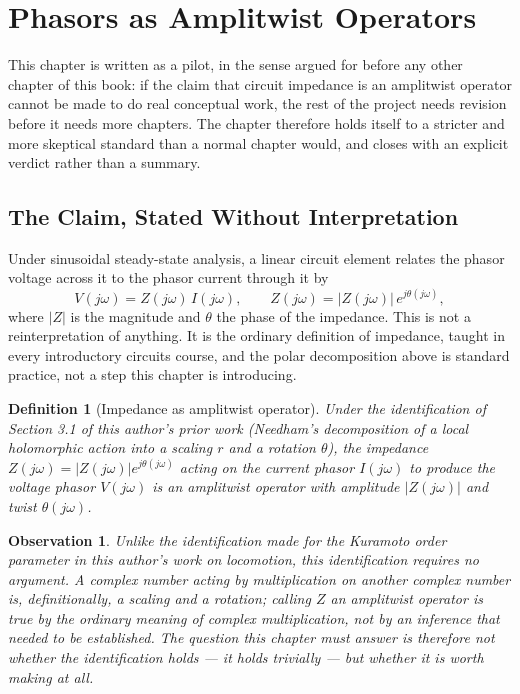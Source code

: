 \documentclass[12pt]{article}
\newtheorem{definition}{Definition}
\newtheorem{observation}{Observation}
\begin{document}
\section{Phasors as Amplitwist Operators}

This chapter is written as a pilot, in the sense argued for before any other chapter of this book: if the claim that circuit impedance is an amplitwist operator cannot be made to do real conceptual work, the rest of the project needs revision before it needs more chapters. The chapter therefore holds itself to a stricter and more skeptical standard than a normal chapter would, and closes with an explicit verdict rather than a summary.

\subsection{The Claim, Stated Without Interpretation}

Under sinusoidal steady-state analysis, a linear circuit element relates the phasor voltage across it to the phasor current through it by
\[
V(j\omega) = Z(j\omega)\, I(j\omega), \qquad Z(j\omega) = |Z(j\omega)|\, e^{j\theta(j\omega)},
\]
where $|Z|$ is the magnitude and $\theta$ the phase of the impedance. This is not a reinterpretation of anything. It is the ordinary definition of impedance, taught in every introductory circuits course, and the polar decomposition above is standard practice, not a step this chapter is introducing.

\begin{definition}[Impedance as amplitwist operator]
Under the identification of Section 3.1 of this author's prior work (Needham's decomposition of a local holomorphic action into a scaling $r$ and a rotation $\theta$), the impedance $Z(j\omega) = |Z(j\omega)|e^{j\theta(j\omega)}$ acting on the current phasor $I(j\omega)$ to produce the voltage phasor $V(j\omega)$ is an amplitwist operator with amplitude $|Z(j\omega)|$ and twist $\theta(j\omega)$.
\end{definition}

\begin{observation}
Unlike the identification made for the Kuramoto order parameter in this author's work on locomotion, this identification requires no argument. A complex number acting by multiplication on another complex number is, definitionally, a scaling and a rotation; calling $Z$ an amplitwist operator is true by the ordinary meaning of complex multiplication, not by an inference that needed to be established. The question this chapter must answer is therefore not whether the identification holds — it holds trivially — but whether it is worth making at all.
\end{observation}
\end{document}
